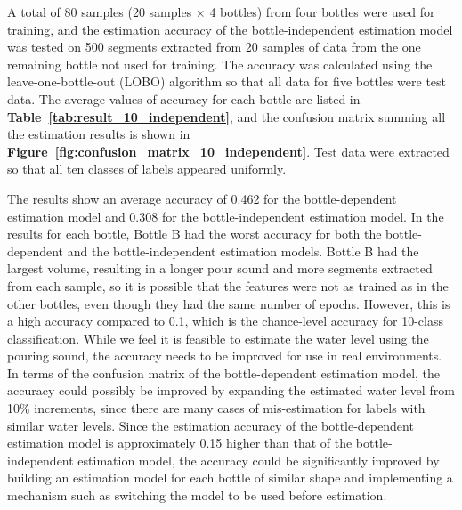 \documentclass[sigconf]{acmart}
\newcommand\figref[1]{\textbf{Figure~\ref{fig:#1}}}
\newcommand\tabref[1]{\textbf{Table~\ref{tab:#1}}}
\begin{document}
A total of 80 samples (20 samples $\times$ 4 bottles) from four bottles were used for training, and the estimation accuracy of the bottle-independent estimation model was tested on 500 segments extracted from 20 samples of data from the one remaining bottle not used for training. The accuracy was calculated using the leave-one-bottle-out (LOBO) algorithm so that all data for five bottles were test data. The average values of accuracy for each bottle are listed in \tabref{result_10_independent}, and the confusion matrix summing all the estimation results is shown in \figref{confusion_matrix_10_independent}. Test data were extracted so that all ten classes of labels appeared uniformly.\par

The results show an average accuracy of 0.462 for the bottle-dependent estimation model and 0.308 for the bottle-independent estimation model. In the results for each bottle, Bottle B had the worst accuracy for both the bottle-dependent and the bottle-independent estimation models. Bottle B had the largest volume, resulting in a longer pour sound and more segments extracted from each sample, so it is possible that the features were not as trained as in the other bottles, even though they had the same number of epochs. However, this is a high accuracy compared to 0.1, which is the chance-level accuracy for 10-class classification. While we feel it is feasible to estimate the water level using the pouring sound, the accuracy needs to be improved for use in real environments. In terms of the confusion matrix of the bottle-dependent estimation model, the accuracy could possibly be improved by expanding the estimated water level from 10\% increments, since there are many cases of mis-estimation for labels with similar water levels. Since the estimation accuracy of the bottle-dependent estimation model is approximately 0.15 higher than that of the bottle-independent estimation model, the accuracy could be significantly improved by building an estimation model for each bottle of similar shape and implementing a mechanism such as switching the model to be used before estimation.
\end{document}
